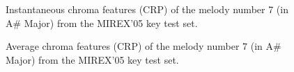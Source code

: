 \documentclass{article}
\begin{document}
\begin{figure}
 \centerline{}
 \caption{Instantaneous chroma features (CRP) of the melody number 7 (in A\# Major) from the MIREX'05 key test set.}
 \label{fig:chroma07crp}
\end{figure}

\begin{figure}
 \centerline{}
 \caption{Average chroma features (CRP) of the melody number 7 (in A\# Major) from the MIREX'05 key test set.}
 \label{fig:averagechroma07crp}
\end{figure}
\end{document}
